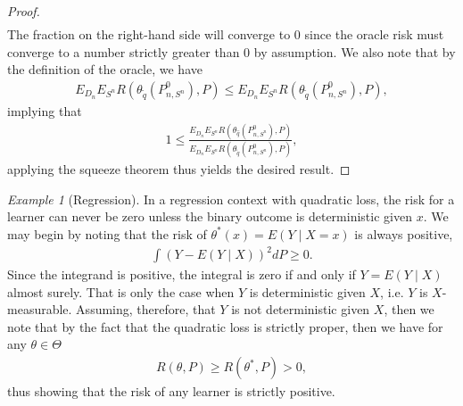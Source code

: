 \documentclass[11pt, a4paper]{article}
\theoremstyle{definition}
\theoremstyle{remark}
\newtheorem{example}{Example}
\newcommand{\q}{q}
\newcommand{\btheta}{\theta}
\newcommand{\Sn}{S^n}
\begin{document}
\begin{proof}
\begin{align*}
    \end{align*}
    The fraction on the right-hand side will converge to $0$ since the oracle risk must converge to a number strictly greater than $ 0 $ by assumption. We also note that by the definition of the oracle, we have 
    \begin{align*}
        E_{D_n} E_{\Sn} R(\btheta_{ \tilde{\q}}(P_{n,\Sn}^{0}), P) \leq E_{D_n} E_{\Sn} R(\btheta_{ \tilde{\q}}(P_{n,\Sn}^{0}), P),
    \end{align*}
    implying that 
        \begin{align*}
            1 \leq \frac{E_{D_n} E_{\Sn} R(\btheta_{\hat{\q}}(P_{n, \Sn}^{0}), P)}{E_{D_n} E_{\Sn} R(\btheta_{ \tilde{\q}}(P_{n,\Sn}^{0}), P)}, 
    \end{align*}
    applying the squeeze theorem thus yields the desired result.         
\end{proof}

\begin{example}[Regression]
   In a regression context with quadratic loss, the risk for a learner can never be zero unless the binary outcome is deterministic given $ x $. We may begin by noting that the risk of $ \theta^*(x) = E(Y \mid X = x) $ is always positive,
   \begin{align*}
       \int (Y - E(Y \mid X))^2 d P \geq 0. 
   \end{align*}
   Since the integrand is positive, the integral is zero if and only if $ Y = E(Y \mid X) $ almost surely. That is only the case when $ Y $ is deterministic given $ X $, i.e. $ Y $ is $ X $-measurable. Assuming, therefore, that $ Y $ is not deterministic given $ X $, then we note that by the fact that the quadratic loss is strictly proper, then we have for any $ \theta \in \Theta $
   \begin{align*}
       R(\theta, P) \geq R(\theta^*, P) > 0,
   \end{align*}
    thus showing that the risk of any learner is strictly positive.
\end{example}


\end{document}
